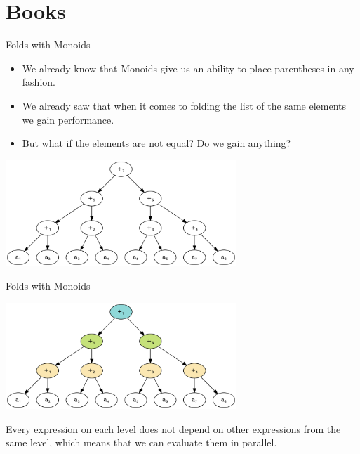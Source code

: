 \documentclass[presentation,aspectratio=169,smaller]{beamer}
\begin{document}
\section*{Books}
\label{sec:org40621b6}

\begin{frame}[label={sec:orgfe35ece}]{Folds with Monoids}
\begin{itemize}
\item We already know that Monoids give us an ability to place parentheses in any
fashion.
\item We already saw that when it comes to folding the list of the same elements we
gain performance.
\item But what if the elements are not equal? Do we gain anything?
\end{itemize}

\pause
\begin{center}
\includegraphics[height=4cm]{.dot/fold-parallel-1.png}
\end{center}
\end{frame}

\begin{frame}[label={sec:org8815553}]{Folds with Monoids}
\begin{center}
\includegraphics[height=4cm]{.dot/fold-parallel-2.png}
\end{center}

Every expression on each level does not depend on other expressions from the
same level, which means that we can evaluate them in parallel.
\end{frame}
\end{document}
